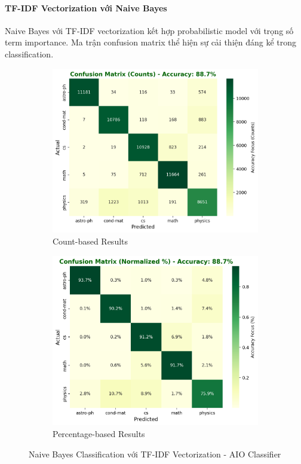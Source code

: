 \paragraph{TF-IDF Vectorization với Naive Bayes}

Naive Bayes với TF-IDF vectorization kết hợp probabilistic model với trọng số term importance. Ma trận confusion matrix thể hiện sự cải thiện đáng kể trong classification.

\begin{figure}[H]
\centering
\begin{subfigure}{0.48\textwidth}
    \centering
    \includegraphics[width=\textwidth]{image/NB_tfidf_count.png}
    \caption{Count-based Results}
    \label{fig:nb_tfidf_count_improvements}
\end{subfigure}
\hfill
\begin{subfigure}{0.48\textwidth}
    \centering
    \includegraphics[width=\textwidth]{image/NB_tfidf_percent.png}
    \caption{Percentage-based Results}
    \label{fig:nb_tfidf_percent_improvements}
\end{subfigure}
\caption{Naive Bayes Classification với TF-IDF Vectorization - AIO Classifier}
\label{fig:nb_tfidf_results_improvements}
\end{figure}


